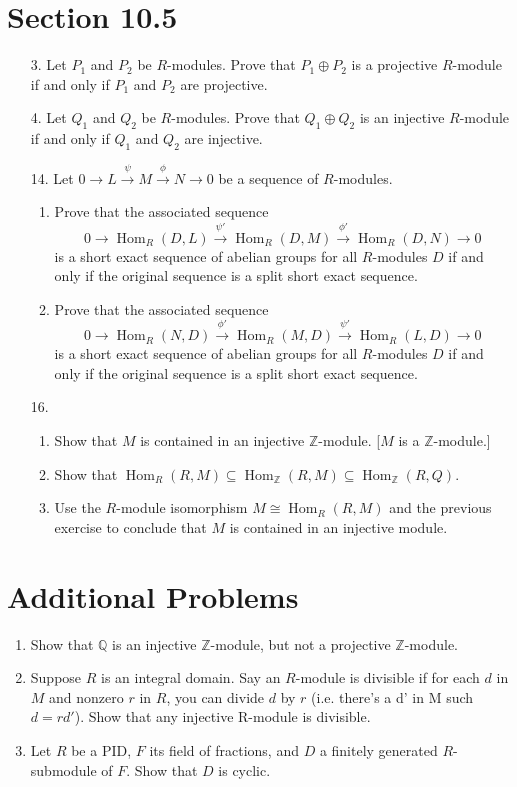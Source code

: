 \documentclass[12pt,leqno]{book}
\theoremstyle{definition}
\newcommand{\Hom}{\operatorname{Hom}}
\newcommand{\Z}{\mathbb{Z}}
\newcommand{\Q}{\mathbb{Q}}
\begin{document}
\section*{Section 10.5}
\begin{enumerate}
 \item [3.] Let $P_1$ and $P_2$ be $R$-modules. Prove that $P_1\oplus P_2$ is a projective $R$-module if and only if $P_1$ and $P_2$ are projective.
 \item [4.] Let $Q_1$ and $Q_2$ be $R$-modules. Prove that $Q_1\oplus Q_2$ is an injective $R$-module if and only if $Q_1$ and $Q_2$ are injective.
 \item [14.] Let $0\longrightarrow L\overset{\psi}{\longrightarrow}M\overset{\phi}{\longrightarrow}N\longrightarrow0$ be a sequence of $R$-modules.
  \begin{enumerate}
   \item Prove that the associated sequence \[0\longrightarrow \Hom_R(D,L)\overset{\psi'}{\longrightarrow}\Hom_R(D,M)\overset{\phi'}{\longrightarrow}\Hom_R(D,N)\longrightarrow0\] is a short exact sequence of abelian groups for all $R$-modules $D$ if and only if the original sequence is a split short exact sequence.
  \item Prove that the associated sequence \[0\longrightarrow \Hom_R(N,D)\overset{\phi'}{\longrightarrow}\Hom_R(M,D)\overset{\psi'}{\longrightarrow}\Hom_R(L,D)\longrightarrow0\] is a short exact sequence of abelian groups for all $R$-modules $D$ if and only if the original sequence is a split short exact sequence.
  \end{enumerate}

 \item [16.]\indent
  \begin{enumerate}
   \item Show that $M$ is contained in an injective $\Z$-module. [$M$ is a $\Z$-module.]
   \item Show that $\Hom_R(R,M)\subseteq\Hom_{\Z}(R,M)\subseteq\Hom_{\Z}(R,Q)$.
   \item Use the $R$-module isomorphism $M\cong\Hom_R(R,M)$ and the previous exercise to conclude that $M$ is contained in an injective module.
  \end{enumerate}

\end{enumerate}

\section*{Additional Problems}
\begin{enumerate}
 \item Show that $\Q$ is an injective $\Z$-module, but not a projective $\Z$-module. 
 \item Suppose $R$ is an integral domain. Say an $R$-module is divisible if for each $d$ in $M$ and nonzero $r$ in $R$, you can divide $d$ by $r$ (i.e. there's a d' in M such $d=rd'$). Show that any injective R-module is divisible.
 \item Let $R$ be a PID, $F$ its field of fractions, and $D$ a finitely generated $R$-submodule of $F$. Show that $D$ is cyclic. 
\end{enumerate}
\end{document}
